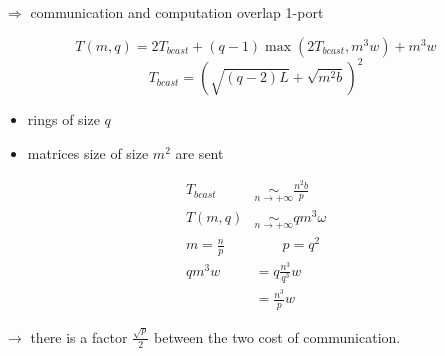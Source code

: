 $\Rightarrow$ communication and computation overlap 1-port

\[T(m,q)=2T_{bcast}+(q-1)\max (2T_{bcast},m^3w)+m^3w\]
\[T_{bcast}=(\sqrt{(q-2)L}+\sqrt{m^2b})^2\]
\begin{itemize}
\item rings of size $q$
\item matrices size of size $m^2$ are sent
\end{itemize}

\begin{align*}
T_{bcast} &\underset{n\to +\infty}{\sim}\frac{n^2b}{p}\\
T(m,q) &\underset{n\to +\infty}{\sim} qm^3 \omega\\
m=\frac{n}{p} &\qquad p=q^2\\
qm^3w &= q \frac{n^3}{q^3}w\\
& = \frac{n^3}{p}w
\end{align*}

$\to$ there is a factor $\frac{\sqrt{p}}{2}$ between the two cost of communication.